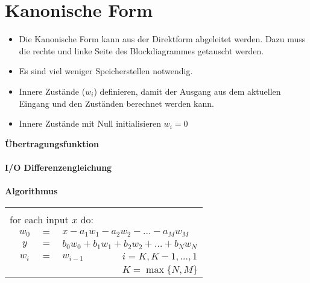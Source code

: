 \section{Kanonische Form}
	\begin{itemize}
	 \item Die Kanonische Form kann aus der Direktform abgeleitet werden. Dazu muss die rechte und linke Seite des Blockdiagrammes getauscht werden.\\[-0.6cm]
	 \item Es sind viel weniger Speicherstellen notwendig.\\[-0.6cm]
	 \item Innere Zustände ($w_i$) definieren, damit der Ausgang aus dem aktuellen Eingang und den Zuständen berechnet werden kann. \\[-0.6cm]
	 \item Innere Zustände mit Null initialisieren $w_i = 0$
	\end{itemize}
	\begin{minipage}{0.57\textwidth}
		\textbf{Übertragungsfunktion}\\[0.2cm]
		\\[0.4cm]
		\textbf{I/O Differenzengleichung}\\[0.2cm]
		\\[0.4cm]
		\textbf{Algorithmus}\\[0.2cm]
		\begin{tabular}{|lclll|}
		 \hline &&&&$ $\\[-0.3cm]
		 \multicolumn{5}{|l|}{for each input $x$ do:}\\
		  &$w_0$&$ = $&\multicolumn{2}{l|}{$x - a_1w_1 - a_2w_2 - \hdots  - a_Mw_M$}\\[0.05cm]
		  &$y$&$ =$&\multicolumn{2}{l|}{$b_0w_0 + b_1w_1 + b_2w_2 + \hdots + b_Nw_N$}\\[0.05cm]
		  &$w_i$& $=$&$ w_{i-1}$ & $\qquad\quad i = K,K-1,\hdots,1$\\[0.05cm]
		  & & & & $\qquad\quad K = \max\{N,M\}$\\[0.1cm]
		 \hline
		\end{tabular}
	\end{minipage}
